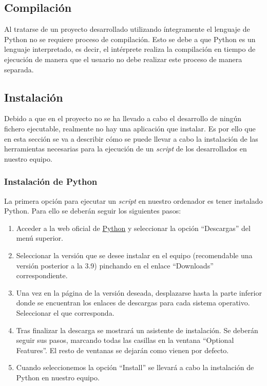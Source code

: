 \begin{itemize}
\subsection{Compilación}

Al tratarse de un proyecto desarrollado utilizando íntegramente el lenguaje de Python no se requiere proceso de compilación. Esto se debe a que Python es un lenguaje interpretado, es decir, el intérprete realiza la compilación en tiempo de ejecución de manera que el usuario no debe realizar este proceso de manera separada.

\subsection{Instalación}

Debido a que en el proyecto no se ha llevado a cabo el desarrollo de ningún fichero ejecutable, realmente no hay una aplicación que instalar. Es por ello que en esta sección se va a describir cómo se puede llevar a cabo la instalación de las herramientas necesarias para la ejecución de un \textit{script} de los desarrollados en nuestro equipo.

\subsubsection{Instalación de Python}

La primera opción para ejecutar un \textit{script} en nuestro ordenador es tener instalado Python. Para ello se deberán seguir los siguientes pasos:

\begin{enumerate}
    \item Acceder a la web oficial de \href{https://www.python.org/}{Python} y seleccionar la opción ``Descargas'' del menú superior.
    \item Seleccionar la versión que se desee instalar en el equipo (recomendable una versión posterior a la 3.9) pinchando en el enlace ``Downloads'' correspondiente.
    \item Una vez en la página de la versión deseada, desplazarse hasta la parte inferior donde se encuentran los enlaces de descargas para cada sistema operativo. Seleccionar el que corresponda. 
    \item Tras finalizar la descarga se mostrará un asistente de instalación. Se deberán seguir sus pasos, marcando todas las casillas en la ventana ``Optional Features''. El resto de ventanas se dejarán como vienen por defecto.
    \item Cuando seleccionemos la opción ``Install'' se llevará a cabo la instalación de Python en nuestro equipo.
\end{enumerate}


\end{itemize}
